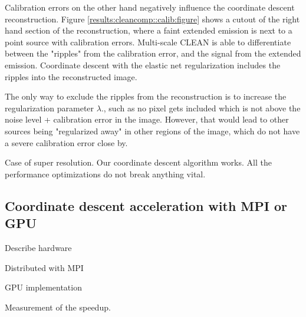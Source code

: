 Calibration errors on the other hand negatively influence the coordinate descent reconstruction. Figure \ref{results:cleancomp::calib:figure} shows a cutout of the right hand section of the reconstruction, where a faint extended emission is next to a point source with calibration errors. Multi-scale CLEAN is able to differentiate between the "ripples" from the calibration error, and the signal from the extended emission. Coordinate descent with the elastic net regularization includes the ripples into the reconstructed image. 

The only way to exclude the ripples from the reconstruction is to increase the regularization parameter $\lambda$., such as no pixel gets included which is not above the noise level + calibration error in the image. However, that would lead to other sources being "regularized away" in other regions of the image, which do not have a severe calibration error close by. 


Case of super resolution.
Our coordinate descent algorithm works. All the performance optimizations do not break anything vital.


\subsection{Coordinate descent acceleration with MPI or GPU}\label{results:speedup}
Describe hardware

Distributed with MPI

GPU implementation

Measurement of the speedup.

